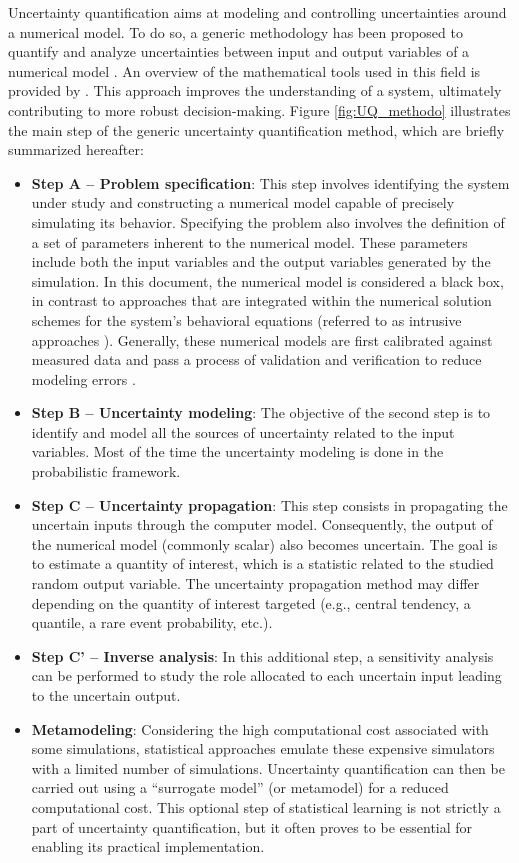 Uncertainty quantification aims at modeling and controlling uncertainties around a numerical model. 
To do so, a generic methodology has been proposed to quantify and analyze uncertainties between input and output variables of a numerical model \citep{rocquigny_2008}. 
An overview of the mathematical tools used in this field is provided by \citet{sullivan_2015}. 
This approach improves the understanding of a system, ultimately contributing to more robust decision-making. 
Figure \ref{fig:UQ_methodo} illustrates the main step of the generic uncertainty quantification method, which are briefly summarized hereafter: 
\begin{itemize}
    \item \textbf{Step A -- Problem specification}:     
    This step involves identifying the system under study and constructing a numerical model capable of precisely simulating its behavior. 
    Specifying the problem also involves the definition of a set of parameters inherent to the numerical model. 
    These parameters include both the input variables and the output variables generated by the simulation. 
    In this document, the numerical model is considered a black box, in contrast to approaches that are integrated within the numerical solution schemes for the system's behavioral equations (referred to as intrusive approaches \citep{lemaitre_2010}). 
    Generally, these numerical models are first calibrated against measured data and pass a process of validation and verification to reduce modeling errors \citep{oberkampf_2010_VVUQ}.  
    \item \textbf{Step B -- Uncertainty modeling}: 
    The objective of the second step is to identify and model all the sources of uncertainty related to the input variables. 
    Most of the time the uncertainty modeling is done in the probabilistic framework.
    \item \textbf{Step C -- Uncertainty propagation}:
    This step consists in propagating the uncertain inputs through the computer model.  
    Consequently, the output of the numerical model (commonly scalar) also becomes uncertain. 
    The goal is to estimate a quantity of interest, which is a statistic related to the studied random output variable. 
    The uncertainty propagation method may differ depending on the quantity of interest targeted (e.g., central tendency, a quantile, a rare event probability, etc.).    
    \item \textbf{Step C' -- Inverse analysis}: 
    In this additional step, a sensitivity analysis can be performed to study the role allocated to each uncertain input leading to the uncertain output. 
    \item \textbf{Metamodeling}: 
    Considering the high computational cost associated with some simulations, statistical approaches emulate these expensive simulators with a limited number of simulations. 
    Uncertainty quantification can then be carried out using a ``surrogate model'' (or metamodel) for a reduced computational cost. 
    This optional step of statistical learning is not strictly a part of uncertainty quantification, but it often proves to be essential for enabling its practical implementation.
\end{itemize}


